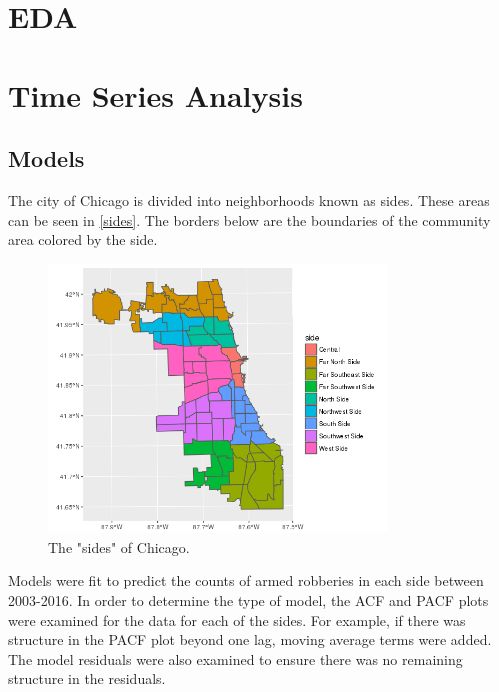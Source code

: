 \documentclass{article} %
\begin{document}
\section{EDA}

\section{Time Series Analysis}

\subsection{Models}

\noindent The city of Chicago is divided into neighborhoods known as sides. These areas can be seen in \autoref{sides}. The borders below are the boundaries of the community area colored by the side.  

\begin{figure}[h]
\begin{center}

\includegraphics[width=0.8\textwidth,keepaspectratio]{CopyOfside.png}
\caption{The "sides" of Chicago.}
\label{sides}
\end{center}
\end{figure}

\noindent Models were fit to predict the counts of armed robberies in each side between 2003-2016. In order to determine the type of model, the ACF and PACF plots were examined for the data for each of the sides. For example, if there was structure in the PACF plot beyond one lag, moving average terms were added. The model residuals were also examined to ensure there was no remaining structure in the residuals. 
\end{document}
